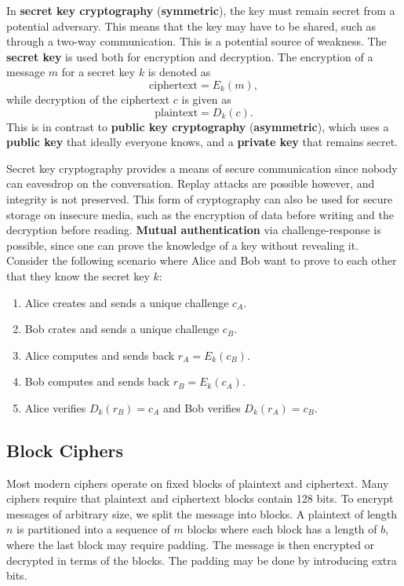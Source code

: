 \documentclass[11pt]{article}
\theoremstyle{plain} %
\theoremstyle{definition}
\theoremstyle{example}
\theoremstyle{remark}
\begin{document}
In \textbf{secret key cryptography} (\textbf{symmetric}), the key must remain secret from a potential adversary. This means that the key may have to be shared, such as through a two-way communication. This is a potential source of weakness. The \textbf{secret key} is used both for encryption and decryption. The encryption of a message $m$ for a secret key $k$ is denoted as 
$$\text{ciphertext} = E_k(m),$$
while decryption of the ciphertext $c$ is given as 
$$\text{plaintext} = D_k(c).$$
This is in contrast to \textbf{public key cryptography} (\textbf{asymmetric}), which uses a \textbf{public key} that ideally everyone knows, and a \textbf{private key} that remains secret. 

Secret key cryptography provides a means of secure communication since nobody can eavesdrop on the conversation. Replay attacks are possible however, and integrity is not preserved. This form of cryptography can also be used for secure storage on insecure media, such as the encryption of data before writing and the decryption before reading. \textbf{Mutual authentication} via challenge-response is possible, since one can prove the knowledge of a key without revealing it. Consider the following scenario where Alice and Bob want to prove to each other that they know the secret key $k$:
\begin{enumerate}	
	\item Alice creates and sends a unique challenge $c_A$. 
	\item Bob crates and sends a unique challenge $c_B$.
	\item Alice computes and sends back $r_A = E_k(c_B)$.
	\item Bob computes and sends back $r_B = E_k(c_A)$. 
	\item Alice verifies $D_k(r_B) = c_A$ and Bob verifies $D_k(r_A) = c_B$. 
\end{enumerate}

\subsection{Block Ciphers}

Most modern ciphers operate on fixed blocks of plaintext and ciphertext. Many ciphers require that plaintext and ciphertext blocks contain 128 bits. To encrypt messages of arbitrary size, we split the message into blocks. A plaintext of length $n$ is partitioned into a sequence of $m$ blocks where each block has a length of $b$, where the last block may require padding. The message is then encrypted or decrypted in terms of the blocks. The padding may be done by introducing extra bits. 
\end{document}
